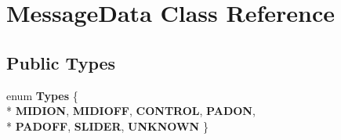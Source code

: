 \hypertarget{classMessageData}{}\section{Message\+Data Class Reference}
\label{classMessageData}
\subsection*{Public Types}
\begin{DoxyCompactItemize}
\item 
enum {\bfseries Types} \{ \\*
{\bfseries M\+I\+D\+I\+ON}, 
{\bfseries M\+I\+D\+I\+O\+FF}, 
{\bfseries C\+O\+N\+T\+R\+OL}, 
{\bfseries P\+A\+D\+ON}, 
\\*
{\bfseries P\+A\+D\+O\+FF}, 
{\bfseries S\+L\+I\+D\+ER}, 
{\bfseries U\+N\+K\+N\+O\+WN}
 \}\hypertarget{classMessageData_a63f99930873414c0908b5e735964e022}{}\label{classMessageData_a63f99930873414c0908b5e735964e022}

\end{DoxyCompactItemize}

